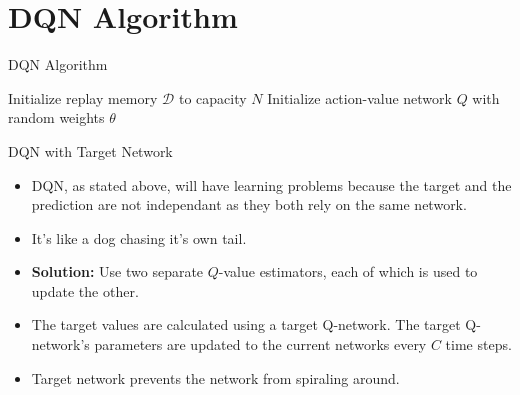 \section{DQN Algorithm}

\begin{frame}{DQN Algorithm}
    \begin{center}
    \footnotesize
    \begin{algorithm}[H]
        \DontPrintSemicolon
        \caption{Deep Q-Network (DQN) with Experience Replay}
        Initialize replay memory $\mathcal{D}$ to capacity $N$\;
        Initialize action-value network $Q$ with random weights $\theta$\;
    \end{algorithm}
    \end{center}
\end{frame}

\begin{frame}{DQN with Target Network}
    \begin{itemize}
        \item DQN, as stated above, will have learning problems because the target and the prediction are not independant as they both rely on the same network.
        \item It's like a dog chasing it's own tail.
        \pause
        \item \textbf{Solution:} Use two separate $Q$-value estimators, each of which is used to update the other.
        \item The target values are calculated using a target Q-network. The target Q-network's parameters are updated to the current networks every $C$ time steps.
        \item Target network prevents the network from spiraling around.
    \end{itemize}
\end{frame}

